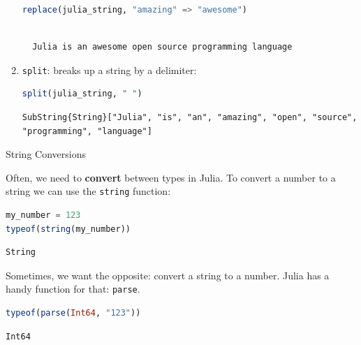 \documentclass[
  notoc %
]{tufte-book}
\makeatletter
\newcommand{\passthrough}[1]{#1}
\renewcommand\subsubsection{%
\@startsection{subsubsection}{3}{\z@ }{-3.25ex\@plus -1ex \@minus -.2ex}{1.5ex \@plus .2ex}{\normalfont \normalsize \bfseries }
}
\makeatother
\begin{document}
\begin{enumerate}
  \begin{lstlisting}[language=Julia]
  replace(julia_string, "amazing" => "awesome")
  \end{lstlisting}

  \begin{lstlisting}[language=Output]

  Julia is an awesome open source programming language

  \end{lstlisting}
\item
  \passthrough{\lstinline!split!}: breaks up a string by a delimiter:

  \begin{lstlisting}[language=Julia]
  split(julia_string, " ")
  \end{lstlisting}

  \begin{lstlisting}[language=Output]
  SubString{String}["Julia", "is", "an", "amazing", "open", "source", "programming", "language"]
  \end{lstlisting}
\end{enumerate}

\hypertarget{sec:string_conversions}{%
\subsubsection{String Conversions}\label{sec:string_conversions}}

Often, we need to \textbf{convert} between types in Julia. To convert a
number to a string we can use the \passthrough{\lstinline!string!}
function:

\begin{lstlisting}[language=Julia]
my_number = 123
typeof(string(my_number))
\end{lstlisting}

\begin{lstlisting}[language=Output]
String
\end{lstlisting}

Sometimes, we want the opposite: convert a string to a number. Julia has
a handy function for that: \passthrough{\lstinline!parse!}.

\begin{lstlisting}[language=Julia]
typeof(parse(Int64, "123"))
\end{lstlisting}

\begin{lstlisting}[language=Output]
Int64
\end{lstlisting}
\end{document}
